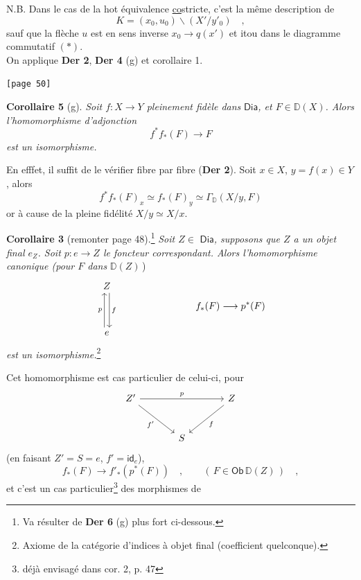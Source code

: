 \documentclass[11pt]{article}
\newcommand{\printedpage}[1]{\marginpar{\footnotesize p.~#1}}
\newcommand{\msp}[1]{\marginpar{\footnotesize [#1]}}
\newcommand{\D}{\mathbb{D}}
\newcommand{\Dia}{\mathsf{Dia}}
\newcommand{\Ob}{\mathsf{Ob}}
\begin{document}
\printedpage{28}

\noindent N.B. Dans le cas de la hot équivalence \underline{co}stricte, c'est la même description de
\[ K = (x_{0}, u_{0})\backslash(X'/y'_{0}) \quad , \]
sauf que la flèche $u$ est en sens inverse $x_{0} \to q(x')$ et itou dans le diagramme commutatif $(*)$.\\
On applique \textbf{Der 2}, \textbf{Der 4} (g) et corollaire 1.

\noindent\msp{page 50}\texttt{[page 50]}

\noindent\textbf{Corollaire 5} (g). \textit{Soit $f : X \to Y$ pleinement fidèle dans} $\Dia$\textit{, et $F \in \D(X)$. Alors l'homomorphisme d'adjonction}
\[ f^{*} f_{*}(F) \longrightarrow F \]
\textit{est un isomorphisme.}

En efffet, il suffit de le vérifier fibre par fibre (\textbf{Der 2}). Soit $x \in X$, $y = f(x) \in Y$, %
alors
\[ f^{*} f_{*}(F)_{x} \simeq f_{*}(F)_{y} \simeq \Gamma_{\D}(X/y, F) \]
or à cause de la pleine fidélité $X/y \simeq X/x$.

\noindent\textbf{Corollaire 3} (remonter page 48).\footnote[20]{Va résulter de \textbf{Der 6} (g) plus fort ci-dessous.} \textit{Soit $Z \in$} $\Dia$\textit{, supposons que $Z$ a un objet final $e_{Z}$. Soit $p : e \to Z$ le foncteur correspondant. Alors l'homomorphisme canonique (pour $F$ dans} $\D(Z)$\,)
\[
\begin{tikzcd}[row sep=huge]
Z \arrow[d, shift left=0.6ex, "f"] \\
e \arrow[u, shift left=0.6ex, "p"]
\end{tikzcd}
\qquad\qquad\qquad\qquad
f_{*}(F) \longrightarrow p^{*}(F)
\]
\textit{est un isomorphisme.}\footnote[21]{Axiome de la catégorie d'indices à objet final (coefficient quelconque).}

Cet homomorphisme est cas particulier de celui-ci, pour
\[
\begin{tikzcd}[row sep=large, column sep=large]
Z' \arrow[rr, "p"] \arrow[dr, "f'"'] & & Z \arrow[dl, "f"] \\
& S &
\end{tikzcd}
\]
(en faisant $Z' = S = e$, $f' = \mathsf{id}_{e}$),
\[ f_{*}(F) \longrightarrow f'_{*}(p^{*}(F)) \quad , \qquad (\, F \in \Ob\,\D(Z)\,) \quad , \]
et c'est un cas particulier\footnote[22]{déjà envisagé dans cor. 2, p. 47} des morphismes de
\end{document}
